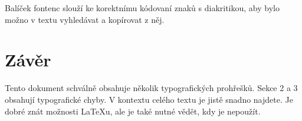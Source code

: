 \documentclass[10pt, a4paper, twocolumn]{article}
\begin{document}
    Balíček fontenc slouží ke korektnímu kódovaní znaků
    s diakritikou, aby bylo možno v textu vyhledávat a kopírovat z něj.
\section {\Large Závěr}
    Tento dokument schválně obsahuje několik typografických prohřešků. Sekce 2 a 3 obsahují typografické chyby. V kontextu celého textu je jistě snadno najdete. Je dobré znát možnosti LaTeXu, ale je také nutné vědět, kdy je nepoužít.
\end{document}

